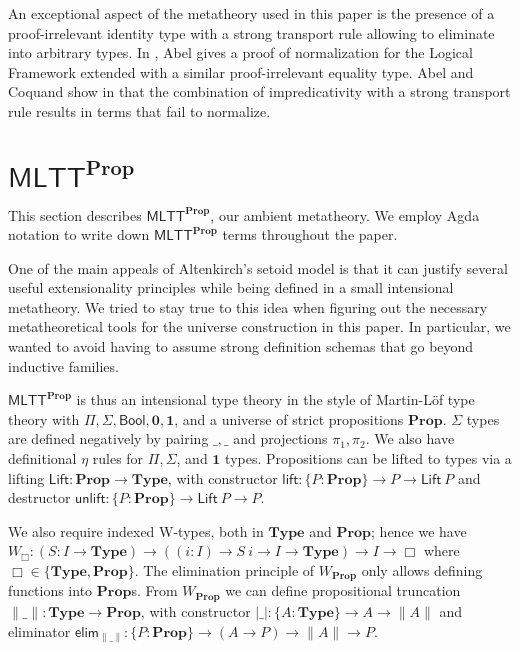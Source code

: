 \documentclass[autoref]{llncs}
\newcommand{\mlttp}{\textsf{MLTT}^{\mProp}}
\newcommand{\mType}{\mathbf{Type}}
\newcommand{\mProp}{\mathbf{Prop}}
\begin{document}
An exceptional aspect of the metatheory used in this paper is the presence of a
proof-irrelevant identity type with a strong transport rule allowing to
eliminate into arbitrary types.
%
In \cite{abel:nbe09}, Abel gives a proof of normalization for the
Logical Framework extended with a similar proof-irrelevant equality type.
%
Abel and Coquand show in \cite{abel2019failure} that the combination of
impredicativity with a strong transport rule results in terms that fail to
normalize.

\section{$\mlttp$}\label{sec:metatheory}

This section describes $\mlttp$, our ambient metatheory. We employ Agda notation
to write down $\mlttp$ terms throughout the paper.

One of the main appeals of Altenkirch's setoid model is that it can justify
several useful extensionality principles while being defined in a small
intensional metatheory.
%
We tried to stay true to this idea when figuring out the necessary
metatheoretical tools for the universe construction in this paper. In
particular, we wanted to avoid having to assume strong definition schemas that
go beyond inductive families.

$\mlttp$ is thus an intensional type theory in the style of Martin-L\"of type
theory with $\Pi, \Sigma, \textsf{Bool}, \mathbf{0}, \mathbf{1}$, and a universe
of strict propositions $\mProp$. $\Sigma$ types are defined negatively by
pairing $\_,\_$ and projections $\pi_1, \pi_2$. We also have definitional $\eta$
rules for $\Pi, \Sigma$, and $\mathbf{1}$ types. Propositions can be lifted to
types via a lifting $\textsf{Lift} : \mProp \to \mType$, with constructor
$\textsf{lift} : \{P : \mProp \} \to P \to \textsf{Lift}\ P$ and destructor
$\textsf{unlift} : \{P : \mProp \} \to \textsf{Lift}\ P \to P$.

We also require indexed W-types, both in $\mType$ and $\mProp$; hence we have $W_\Box
: (S : I\to\mType) \to ((i:I)\to S\ i\to I \to \mType) \to I\to \Box$ where $\Box \in \{\mType, \mProp\}$.
The elimination principle of $W_\mProp$ only allows defining functions into $\mProp$s.
%
From $W_\mProp$ we can define propositional truncation $\|\_\| : \mType \to \mProp$, with constructor
  $|\_| : \{A : \mType \} \to A \to \| A \|$ and eliminator
  $\textsf{elim}_{\|\_\|} : \{P : \mProp \} \to (A \to P) \to \| A \| \to P$.
\end{document}
